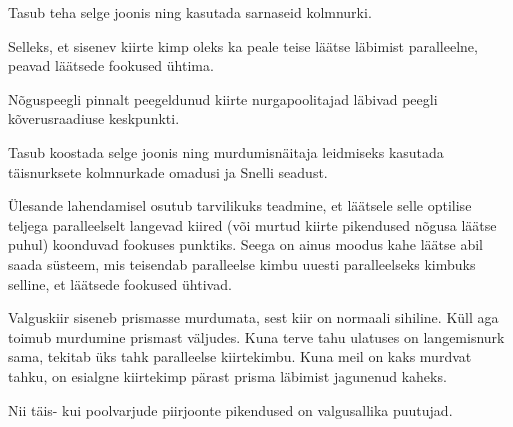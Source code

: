 \documentclass[10pt]{article}
\begin{document}
{
\hint
Tasub teha selge joonis ning kasutada sarnaseid kolmnurki.
\probend
\bigskip


\hint
Selleks, et sisenev kiirte kimp oleks ka peale teise läätse läbimist paralleelne, peavad läätsede fookused ühtima.
\probend
\bigskip


\hint
Nõguspeegli pinnalt peegeldunud kiirte nurgapoolitajad läbivad peegli kõverusraadiuse keskpunkti.
\probend
\bigskip


\hint
Tasub koostada selge joonis ning murdumisnäitaja leidmiseks kasutada täisnurksete kolmnurkade omadusi ja Snelli seadust.
\probend
\bigskip


\hint
Ülesande lahendamisel osutub tarvilikuks teadmine, et läätsele selle optilise teljega paralleelselt langevad kiired (või murtud kiirte pikendused nõgusa läätse puhul) koonduvad fookuses punktiks. Seega on ainus moodus kahe läätse abil saada süsteem, mis teisendab paralleelse kimbu uuesti paralleelseks kimbuks selline, et läätsede fookused ühtivad.
\probend
\bigskip


\hint
Valguskiir siseneb prismasse murdumata, sest kiir on normaali sihiline. Küll aga toimub murdumine prismast väljudes. Kuna terve tahu ulatuses on langemisnurk sama, tekitab üks tahk paralleelse kiirtekimbu. Kuna meil on kaks murdvat tahku, on esialgne kiirtekimp pärast prisma läbimist jagunenud kaheks.
\probend
\bigskip


\hint
Nii täis- kui poolvarjude piirjoonte pikendused on valgusallika puutujad.
\probend
\bigskip

}
\end{document}
